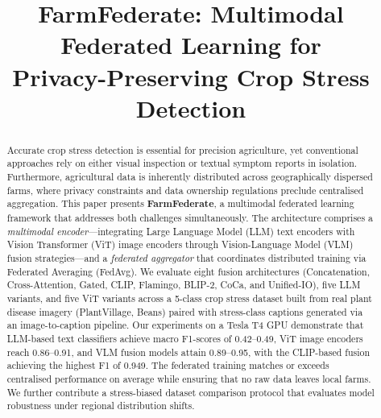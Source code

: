 \documentclass[conference]{IEEEtran}
\begin{document}
\renewcommand{\dbltopfraction}{0.92}
\renewcommand{\dblfloatpagefraction}{0.85}
\renewcommand{\topfraction}{0.92}
\renewcommand{\floatpagefraction}{0.85}
\renewcommand{\textfraction}{0.05}
\setcounter{dbltopnumber}{4}
\setcounter{topnumber}{4}

\title{FarmFederate: Multimodal Federated Learning for\\
Privacy-Preserving Crop Stress Detection}

\author{
}

\maketitle

\begin{abstract}
Accurate crop stress detection is essential for precision agriculture, yet conventional
approaches rely on either visual inspection or textual symptom reports in isolation.
Furthermore, agricultural data is inherently distributed across geographically dispersed
farms, where privacy constraints and data ownership regulations preclude centralised
aggregation. This paper presents \textbf{FarmFederate}, a multimodal federated learning
framework that addresses both challenges simultaneously. The architecture comprises a
\textit{multimodal encoder}---integrating Large Language Model (LLM) text encoders with
Vision Transformer (ViT) image encoders through Vision-Language Model (VLM) fusion
strategies---and a \textit{federated aggregator} that coordinates distributed training
via Federated Averaging (FedAvg). We evaluate eight fusion architectures (Concatenation,
Cross-Attention, Gated, CLIP, Flamingo, BLIP-2, CoCa, and Unified-IO), five LLM variants,
and five ViT variants across a 5-class crop stress dataset built from real plant disease
imagery (PlantVillage, Beans) paired with stress-class captions generated via an
image-to-caption pipeline. Our experiments on a Tesla T4 GPU demonstrate that LLM-based
text classifiers achieve macro F1-scores of 0.42--0.49, ViT image encoders reach
0.86--0.91, and VLM fusion models attain 0.89--0.95, with the CLIP-based fusion
achieving the highest F1 of 0.949. The federated training matches or exceeds
centralised performance on average while ensuring that no raw data leaves local farms. We further
contribute a stress-biased dataset comparison protocol that evaluates model robustness
under regional distribution shifts.
\end{abstract}
\end{document}
